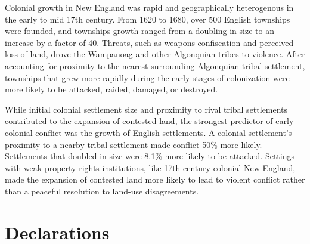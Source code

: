 \documentclass[sn-mathphys]{sn-jnl}%
\theoremstyle{thmstyleone}%
\theoremstyle{thmstyletwo}%
\theoremstyle{thmstylethree}%
\begin{document}
Colonial growth in New England was rapid and geographically heterogenous in the early to mid 17th century. From 1620 to 1680, over 500 English townships were founded, and townships growth ranged from a doubling in size to an increase by a factor of 40. Threats, such as weapons confiscation and perceived loss of land, drove the Wampanoag and other Algonquian tribes to violence. After accounting for proximity to the nearest surrounding Algonquian tribal settlement, townships that grew more rapidly during the early stages of colonization were more likely to be attacked, raided, damaged, or destroyed.

While initial colonial settlement size and proximity to rival tribal settlements contributed to the expansion of contested land, the strongest predictor of early colonial conflict was the growth of English settlements. A colonial settlement's proximity to a nearby tribal settlement made conflict 50\% more likely. Settlements that doubled in size were 8.1\% more likely to be attacked. Settings with weak property rights institutions, like 17th century colonial New England, made the expansion of contested land more likely to lead to violent conflict rather than a peaceful resolution to land-use disagreements. 

\newpage
\backmatter







\section*{Declarations}
\end{document}
